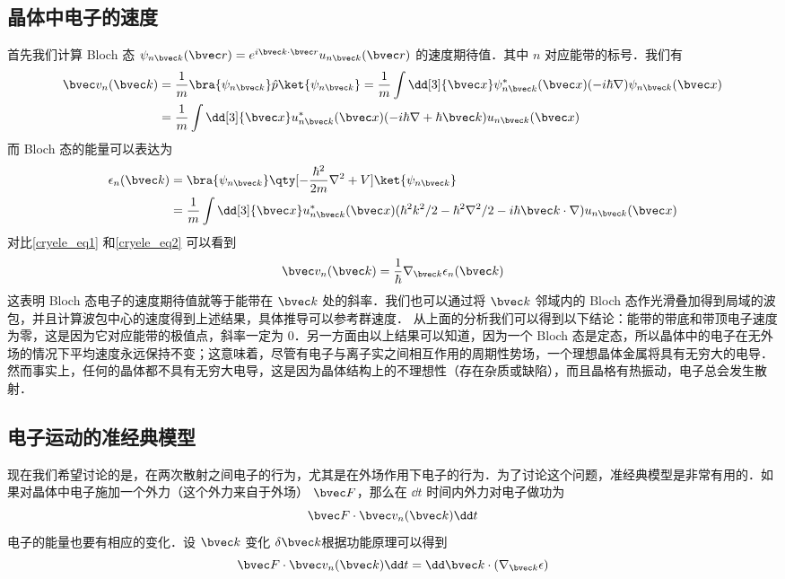 \subsection{晶体中电子的速度}
首先我们计算 Bloch 态 $\psi_{n\bvec k}(\bvec r)=e^{i\bvec k\cdot \bvec r}u_{n\bvec k}(\bvec r)$ 的速度期待值．其中 $n$ 对应能带的标号．我们有
\begin{equation}\label{cryele_eq1}
\begin{aligned}
\bvec v_n(\bvec k)&=\frac{1}{m}\bra{\psi_{n\bvec k}}\hat p\ket{\psi_{n\bvec k}}=\frac{1}{m}\int \dd[3]{\bvec x}\psi_{n\bvec k}^*(\bvec x)(-i\hbar\nabla)\psi_{n\bvec k}(\bvec x)\\
&=\frac{1}{m}\int \dd[3]{\bvec x}u_{n\bvec k}^*(\bvec x)(-i\hbar\nabla+\hbar \bvec k)u_{n\bvec k}(\bvec x)
\end{aligned}
\end{equation}
而 Bloch 态的能量可以表达为
\begin{equation}\label{cryele_eq2}
\begin{aligned}
\epsilon_{n}(\bvec k)&=\bra{\psi_{n\bvec k}} \qty[-\frac{\hbar^2}{2m}\nabla^2+V]\ket{\psi_{n\bvec k}}
\\&=\frac{1}{m}\int \dd[3]{\bvec x} u_{n\bvec k}^*(\bvec x)(\hbar^2k^2/2-\hbar^2\nabla^2/2-i\hbar\bvec k\cdot \nabla)u_{n\bvec k}(\bvec x)
\end{aligned}
\end{equation}
对比\autoref{cryele_eq1} 和\autoref{cryele_eq2} 可以看到
\begin{equation}
\bvec v_n(\bvec k)=\frac{1}{\hbar}\nabla_{\bvec k}\epsilon_{n}(\bvec k)
\end{equation}
这表明 Bloch 态电子的速度期待值就等于能带在 $\bvec k$ 处的斜率．我们也可以通过将 $\bvec k$ 邻域内的 Bloch 态作光滑叠加得到局域的波包，并且计算波包中心的速度得到上述结果，具体推导可以参考群速度． 从上面的分析我们可以得到以下结论：能带的带底和带顶电子速度为零，这是因为它对应能带的极值点，斜率一定为 $0$．另一方面由以上结果可以知道，因为一个 Bloch 态是定态，所以晶体中的电子在无外场的情况下平均速度永远保持不变；这意味着，尽管有电子与离子实之间相互作用的周期性势场，一个理想晶体金属将具有无穷大的电导．然而事实上，任何的晶体都不具有无穷大电导，这是因为晶体结构上的不理想性（存在杂质或缺陷），而且晶格有热振动，电子总会发生散射．
\subsection{电子运动的准经典模型}
现在我们希望讨论的是，在两次散射之间电子的行为，尤其是在外场作用下电子的行为．为了讨论这个问题，准经典模型是非常有用的．如果对晶体中电子施加一个外力（这个外力来自于外场） $\bvec F$，那么在 $\dd t$ 时间内外力对电子做功为
\begin{equation}
\bvec F\cdot \bvec v_n(\bvec k)\dd t
\end{equation}
电子的能量也要有相应的变化．设 $\bvec k$ 变化 $\delta \bvec k$根据功能原理可以得到
\begin{equation}
\bvec F\cdot \bvec v_n(\bvec k)\dd t
=\dd \bvec k\cdot (\nabla_{\bvec k}\epsilon)
\end{equation}
